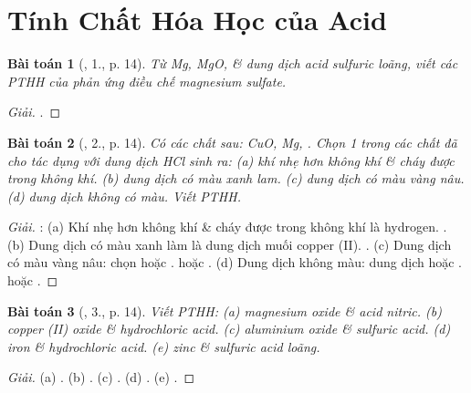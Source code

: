 \documentclass{article}
\newtheorem{baitoan}{Bài toán}
\begin{document}

\section{Tính Chất Hóa Học của Acid}

\begin{baitoan}[\cite{SGK_Hoa_Hoc_9}, 1., p. 14]
	Từ {\rm Mg, MgO, } \& dung dịch acid sulfuric loãng, viết các {\rm PTHH} của phản ứng điều chế magnesium sulfate.
\end{baitoan}

\begin{proof}[Giải]
	.
\end{proof}

\begin{baitoan}[\cite{SGK_Hoa_Hoc_9}, 2., p. 14]
	Có các chất sau: {\rm CuO, Mg, }. Chọn 1 trong các chất đã cho tác dụng với dung dịch {\rm HCl} sinh ra: (a) khí nhẹ hơn không khí \& cháy được trong không khí. (b) dung dịch có màu xanh lam. (c) dung dịch có màu vàng nâu. (d) dung dịch không có màu. Viết {\rm PTHH}.
\end{baitoan}

\begin{proof}[Giải]
	\cite{Ninh_giai_BT_Hoa_Hoc_9}: (a) Khí nhẹ hơn không khí \& cháy được trong không khí là hydrogen. . (b) Dung dịch có màu xanh làm là dung dịch muối copper (II). . (c) Dung dịch có màu vàng nâu: chọn  hoặc .  hoặc . (d) Dung dịch không màu: dung dịch  hoặc .  hoặc .
\end{proof}

\begin{baitoan}[\cite{SGK_Hoa_Hoc_9}, 3., p. 14]
	Viết {\rm PTHH}: (a) magnesium oxide \& acid nitric. (b) copper {\rm(II)} oxide \& hydrochloric acid. (c) aluminium oxide \& sulfuric acid. (d) iron \& hydrochloric acid. (e) zinc \& sulfuric acid loãng.
\end{baitoan}

\begin{proof}[Giải]
	(a) . (b) . (c) . (d) . (e) .
\end{proof}
\end{document}
